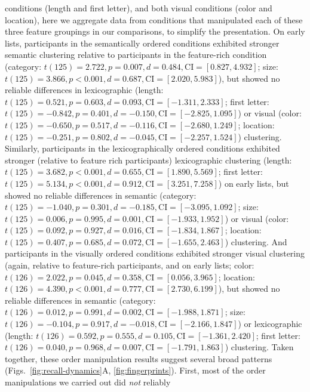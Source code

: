 \documentclass[11pt]{article}
\begin{document}
conditions (length and first letter), and both visual conditions (color and
location), here we aggregate data from conditions that manipulated each of
these three feature groupings in our comparisons, to simplify the presentation.
On early lists, participants in the semantically ordered conditions exhibited
stronger semantic clustering relative to participants in the feature-rich
condition (category: $t(125) = 2.722, p = 0.007, d = 0.484, \mathrm{CI} =
[0.827, 4.932]$; size: $t(125) = 3.866, p < 0.001, d = 0.687, \mathrm{CI} =
[2.020, 5.983]$), but showed no reliable differences in lexicographic (length:
$t(125) = 0.521, p = 0.603, d = 0.093, \mathrm{CI} = [-1.311, 2.333]$; first
letter: $t(125) = -0.842, p = 0.401, d = -0.150, \mathrm{CI} = [-2.825,
1.095]$) or visual (color: $t(125) = -0.650, p = 0.517, d = -0.116, \mathrm{CI}
= [-2.680, 1.249]$; location: $t(125) = -0.251, p = 0.802, d = -0.045,
\mathrm{CI} = [-2.257, 1.524]$) clustering. Similarly, participants in the
lexicographically ordered conditions exhibited stronger (relative to feature
rich participants) lexicographic clustering (length: $t(125) = 3.682, p <
0.001, d = 0.655, \mathrm{CI} = [1.890, 5.569]$; first letter: $t(125) = 5.134,
p < 0.001, d = 0.912, \mathrm{CI} = [3.251, 7.258]$) on early lists, but showed
no reliable differences in semantic (category: $t(125) = -1.040, p = 0.301, d =
-0.185, \mathrm{CI} = [-3.095, 1.092]$; size: $t(125) = 0.006, p = 0.995, d =
0.001, \mathrm{CI} = [-1.933, 1.952]$) or visual (color: $t(125) = 0.092, p =
0.927, d = 0.016, \mathrm{CI} = [-1.834, 1.867]$; location: $t(125) = 0.407, p
= 0.685, d = 0.072, \mathrm{CI} = [-1.655, 2.463]$) clustering. And
participants in the visually ordered conditions exhibited stronger visual
clustering (again, relative to feature-rich participants, and on early lists;
color: $t(126) = 2.022, p = 0.045, d = 0.358, \mathrm{CI} = [0.056, 3.965]$;
location: $t(126) = 4.390, p < 0.001, d = 0.777, \mathrm{CI} = [2.730, 6.199]
$), but showed no reliable differences in semantic (category: $t(126) = 0.012,
p = 0.991, d = 0.002, \mathrm{CI} = [-1.988, 1.871]$; size: $t(126) = -0.104, p
= 0.917, d = -0.018, \mathrm{CI} = [-2.166, 1.847] $) or lexicographic (length:
$t(126) = 0.592, p = 0.555, d = 0.105, \mathrm{CI} = [-1.361, 2.420]$; first
letter: $t(126) = 0.040, p = 0.968, d = 0.007, \mathrm{CI} = [-1.791, 1.863]$)
clustering. Taken together, these order manipulation results suggest several
broad patterns (Figs.~\ref{fig:recall-dynamics}A, \ref{fig:fingerprints}).
First, most of the order manipulations we carried out did \textit{not} reliably
\end{document}
